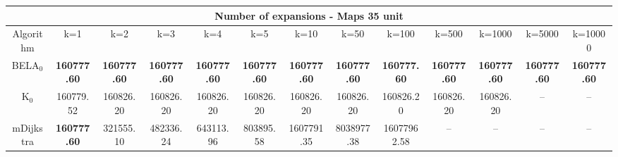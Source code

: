 \begin{tabular}{c|cccccccccccc}\toprule
\multicolumn{13}{c}{Number of expansions - Maps 35 unit}\\ \midrule
Algorithm & k=1 & k=2 & k=3 & k=4 & k=5 & k=10 & k=50 & k=100 & k=500 & k=1000 & k=5000 & k=10000 \\ \midrule
BELA$_0$ & \textbf{160777.60} & \textbf{160777.60} & \textbf{160777.60} & \textbf{160777.60} & \textbf{160777.60} & \textbf{160777.60} & \textbf{160777.60} & \textbf{160777.60} & \textbf{160777.60} & \textbf{160777.60} & \textbf{160777.60} & \textbf{160777.60} \\
K$_0$ & 160779.52 & 160826.20 & 160826.20 & 160826.20 & 160826.20 & 160826.20 & 160826.20 & 160826.20 & 160826.20 & 160826.20 & -- & -- \\
mDijkstra & \textbf{160777.60} & 321555.10 & 482336.24 & 643113.96 & 803895.58 & 1607791.35 & 8038977.38 & 16077962.58 & -- & -- & -- & -- \\ \bottomrule 
\end{tabular}
